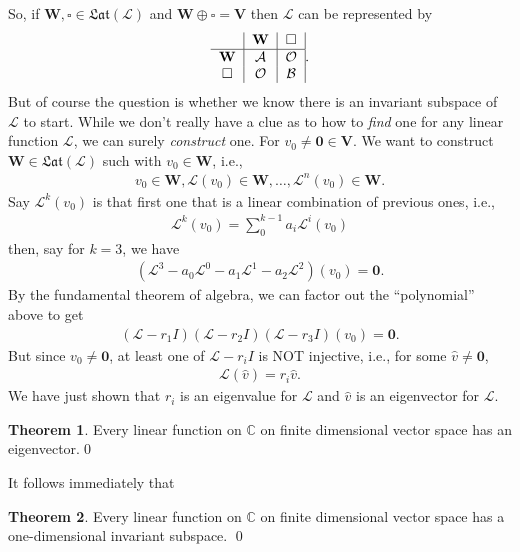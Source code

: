 \documentclass{book}
\theoremstyle{definition}
\newtheorem{thm}{Theorem}[section]
\newcommand{\V}{\mathbf{V}}
\newcommand{\W}{\mathbf{W}}
\newcommand{\lag}{\mathcal{L}}
\begin{document}
So, if $\W, \square \in \mathfrak{Lat}(\lag)$ and $\W \oplus \square = \V$ then $\lag$ can be represented by
\begin{align*}
\begin{tabular}{c|c|c|}
& $\W$ & $\square$\\
\hline
$\W$& $\mathcal{A}$ & $\mathcal{O}$ \\	
$\square$& $\mathcal{O}$  & $\mathcal{B}$ 
\end{tabular}.
\end{align*}
But of course the question is whether we know there is an invariant subspace of $\lag$ to start. While we don't really have a clue as to how to \textit{find} one for any linear function $\lag$, we can surely \textit{construct} one. For $v_0 \neq \mathbf{0} \in \V$. We want to construct $\W \in \mathfrak{Lat}(\lag)$ such with $v_0 \in \W$, i.e.,
\begin{align*}
v_0 \in \W, \lag(v_0) \in \W, \dots, \lag^n(v_0) \in \W.
\end{align*}
Say $\lag^k(v_0)$ is that first one that is a linear combination of previous ones, i.e.,
\begin{align*}
\lag^k(v_0) = \sum^{k-1}_{0} a_i \lag^i (v_0)
\end{align*}
then, say for $k = 3$, we have
\begin{align*}
\left(\lag^3 - a_0 \lag^0 - a_1 \lag^1 - a_2 \lag^2 \right)(v_0) = \mathbf{0}.
\end{align*}
By the fundamental theorem of algebra, we can factor out the ``polynomial'' above to get
\begin{align*}
(\lag - r_1 I)(\lag - r_2 I)(\lag - r_3 I)(v_0) = \mathbf{0}.
\end{align*}
But since $v_0 \neq \mathbf{0}$, at least one of $\lag - r_i I$ is NOT injective, i.e., for some $\hat{v} \neq \mathbf{0}$, 
\begin{align*}
\lag(\hat{v}) = r_i \hat{v}.
\end{align*} 
We have just shown that $r_i$ is an eigenvalue for $\lag$ and $\hat{v}$ is an eigenvector for $\lag$. 

\begin{thm}
	Every linear function on $\mathbb{C}$ on finite dimensional vector space has an eigenvector.\qed
\end{thm}

It follows immediately that
\begin{thm}
	Every linear function on $\mathbb{C}$ on finite dimensional vector space has a one-dimensional invariant subspace. \qed
\end{thm}
\end{document}
